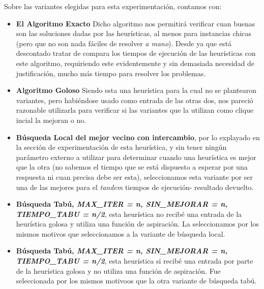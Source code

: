 \par Sobre las variantes elegidas para esta experimentaci\'on, contamos con:

\begin{itemize}
    \item \textbf{El Algoritmo Exacto} Dicho algoritmo nos permitir\'a
        verificar cuan buenas son las soluciones dadas por las heur\'isticas,
        al menos para instancias chicas (pero que no son nada f\'aciles de
        resolver \emph{a mano}). Desde ya que est\'a descontado tratar
        de compara los tiempos de ejecuci\'on de las heur\'isticas con este
        algoritmo, requiriendo este evidentemente y sin demasiada necesidad de
        justificaci\'on, mucho m\'as tiempo para resolver los problemas.

    \item \textbf{Algoritmo Goloso} Siendo esta una heur\'istica para la
        cual no se plantearon variantes, pero habi\'endose usado como
        entrada de las otras dos, nos pareci\'o razonable utilizarla para
        verificar si las variantes que la utilizan como clique incial
        la mejoran o no.

    \item \textbf{B\'usqueda Local del mejor vecino con intercambio}, por
        lo explayado en la secci\'on de experimentaci\'on de esta
        heur\'istica, y sin tener ning\'un par\'ametro externo a utilizar
        para determinar cuando una heur\'istica es mejor que la otra (no
        sabemos el tiempo que se est\'a dispuesto a esperar por una respuesta
        ni cuan precisa debe ser esta), seleccionamos esta variante
        por ser una de las mejores para el \emph{tandem} tiempos de ejecuci\'on-%
        resultado devuelto.

    \item \textbf{B\'usqueda Tab\'u, \emph{MAX\_ITER = n, SIN\_MEJORAR = n,
        TIEMPO\_TABU = n/2}}, esta heur\'istica no recib\'e una entrada
        de la heur\'istica golosa y utiliza una funci\'on de aspiraci\'on.
        La seleccionamos por los mismos motivos que seleccionamos a la
        variante de b\'usqueda local.

    \item \textbf{B\'usqueda Tab\'u, \emph{MAX\_ITER = n, SIN\_MEJORAR = n,
        TIEMPO\_TABU = n/2}}, esta heur\'istica si recib\'e una entrada
        por parte de la heur\'istica golosa y no utiliza una funci\'on
        de aspiraci\'on. Fue seleccionada por los mismos motivoos
        que la otra variante de b\'usqueda tab\'u.
\end{itemize}

